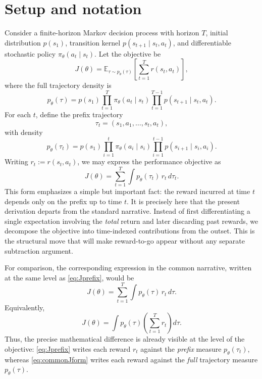 \documentclass[11pt]{article}
\begin{document}
\section{Setup and notation}
Consider a finite-horizon Markov decision process with horizon $T$, initial distribution $p(s_1)$, transition kernel $p(s_{t+1}\mid s_t,a_t)$, and differentiable stochastic policy $\pi_\theta(a_t\mid s_t)$. Let the objective be
\begin{equation}
J(\theta)=\mathbb E_{\tau\sim p_\theta(\tau)}\!\left[\sum_{t=1}^T r(s_t,a_t)\right],
\label{eq:Jfull}
\end{equation}
where the full trajectory density is
\begin{equation}
p_\theta(\tau)=p(s_1)\prod_{t=1}^{T} \pi_\theta(a_t\mid s_t)\prod_{t=1}^{T-1} p(s_{t+1}\mid s_t,a_t).
\label{eq:fulltraj}
\end{equation}
For each $t$, define the prefix trajectory
\[
\tau_t=(s_1,a_1,\dots,s_t,a_t),
\]
with density
\begin{equation}
p_\theta(\tau_t)=p(s_1)\prod_{i=1}^{t} \pi_\theta(a_i\mid s_i)\prod_{i=1}^{t-1} p(s_{i+1}\mid s_i,a_i).
\label{eq:prefixdensity}
\end{equation}
Writing $r_t:=r(s_t,a_t)$, we may express the performance objective as
\begin{equation}
J(\theta)=\sum_{t=1}^T \int p_\theta(\tau_t)\,r_t\,d\tau_t.
\label{eq:Jprefix}
\end{equation}
This form emphasizes a simple but important fact: the reward incurred at time $t$ depends only on the prefix up to time $t$. It is precisely here that the present derivation departs from the standard narrative. Instead of first differentiating a single expectation involving the \emph{total} return and later discarding past rewards, we decompose the objective into time-indexed contributions from the outset. This is the structural move that will make reward-to-go appear without any separate subtraction argument.


For comparison, the corresponding expression in the common narrative, written at the same level as \eqref{eq:Jprefix}, would be
\begin{equation}
J(\theta)=\sum_{t=1}^T \int p_\theta(\tau)\,r_t\,d\tau.
\label{eq:commonJform}
\end{equation}
Equivalently,
\[
J(\theta)=\int p_\theta(\tau)\left(\sum_{t=1}^T r_t\right)d\tau.
\]
Thus, the precise mathematical difference is already visible at the level of the objective: \eqref{eq:Jprefix} writes each reward $r_t$ against the \emph{prefix} measure $p_\theta(\tau_t)$, whereas \eqref{eq:commonJform} writes each reward against the \emph{full} trajectory measure $p_\theta(\tau)$.
\end{document}
